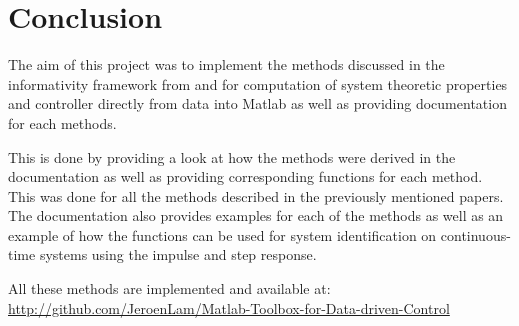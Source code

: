 \section{Conclusion}
The aim of this project was to implement the methods discussed in the informativity framework from \cite{waarde2019data} and \cite{waarde2020noisy} for computation of system theoretic properties and controller directly from data into Matlab as well as providing documentation for each methods.

This is done by providing a look at how the methods were derived in the documentation as well as providing corresponding functions for each method. This was done for all the methods described in the previously mentioned papers. The documentation also provides examples for each of the methods as well as an example of how the functions can be used for system identification on continuous-time systems using the impulse and step response. 

All these methods are implemented and available at: \\
\url{http://github.com/JeroenLam/Matlab-Toolbox-for-Data-driven-Control}
